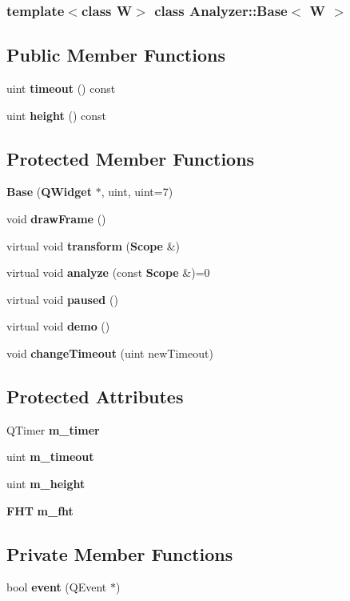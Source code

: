 \subsubsection*{template$<$class W$>$ class Analyzer::Base$<$ W $>$}

\subsection*{Public Member Functions}
\begin{CompactItemize}
\item 
uint {\bf timeout} () const 
\item 
uint {\bf height} () const 
\end{CompactItemize}
\subsection*{Protected Member Functions}
\begin{CompactItemize}
\item 
{\bf Base} ({\bf QWidget} $\ast$, uint, uint=7)
\item 
void {\bf draw\-Frame} ()
\item 
virtual void {\bf transform} ({\bf Scope} \&)
\item 
virtual void {\bf analyze} (const {\bf Scope} \&)=0
\item 
virtual void {\bf paused} ()
\item 
virtual void {\bf demo} ()
\item 
void {\bf change\-Timeout} (uint new\-Timeout)
\end{CompactItemize}
\subsection*{Protected Attributes}
\begin{CompactItemize}
\item 
QTimer {\bf m\_\-timer}
\item 
uint {\bf m\_\-timeout}
\item 
uint {\bf m\_\-height}
\item 
{\bf FHT} {\bf m\_\-fht}
\end{CompactItemize}
\subsection*{Private Member Functions}
\begin{CompactItemize}
\item 
bool {\bf event} (QEvent $\ast$)
\end{CompactItemize}


